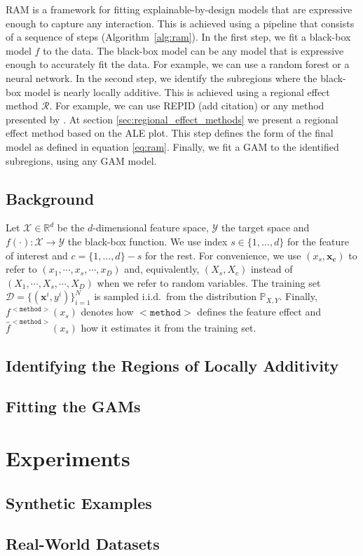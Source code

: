 \documentclass[12pt]{article}
\newcommand{\Rd}{\mathbb{R}^d}
\newcommand{\xb}{\mathbf{x}}
\newcommand{\xc}{\mathbf{x_c}}
\newcommand{\Xcal}{\mathcal{X}}
\newcommand{\Ycal}{\mathcal{Y}}
\begin{document}
RAM is a framework for fitting explainable-by-design models that are expressive enough to capture any interaction.
This is achieved using a pipeline that consists of a sequence of steps (Algorithm~\ref{alg:ram}).
In the first step, we fit a black-box model $f$ to the data.
The black-box model can be any model that is expressive enough to accurately fit the data.
For example, we can use a random forest or a neural network.
In the second step, we identify the subregions where the black-box model is nearly locally additive.
This is achieved using a regional effect method $\mathcal{R}$.
For example, we can use REPID (add citation) or any method presented by \citet{ribeiro2016should}.
At section \ref{sec:regional_effect_methods} we present a regional effect method based on the ALE plot.
This step defines the form of the final model as defined in equation \ref{eq:ram}.
Finally, we fit a GAM to the identified subregions, using any GAM model.

\subsection{Background}

Let \(\Xcal \in \Rd\) be the \(d\)-dimensional feature space, \(\Ycal\) the target space and \(f(\cdot) : \Xcal \rightarrow \Ycal\) the black-box function.  We use index \(s \in \{1, \ldots, d\}\) for the feature of interest and \(c = \{1, \ldots, d\} - s\) for the rest.
For convenience, we use \((x_s, \xc)\) to refer to \((x_1, \cdots , x_s, \cdots, x_D)\) and, equivalently, \((X_s, X_c)\) instead of \((X_1, \cdots , X_s, \cdots, X_D)\) when we refer to random variables.
The training set \(\mathcal{D} = \{(\xb^i, y^i)\}_{i=1}^N\) is sampled
i.i.d.\ from the distribution \(\mathbb{P}_{X,Y}\).  Finally,
\(f^{\mathtt{<method>}}(x_s)\) denotes how \(\mathtt{<method>}\)
defines the feature effect and \(\hat{f}^{\mathtt{<method>}}(x_s)\)
how it estimates it from the training set.


\subsection{Identifying the Regions of Locally Additivity}

\subsection{Fitting the GAMs}

\section{Experiments}

\subsection{Synthetic Examples}

\subsection{Real-World Datasets}
\end{document}
